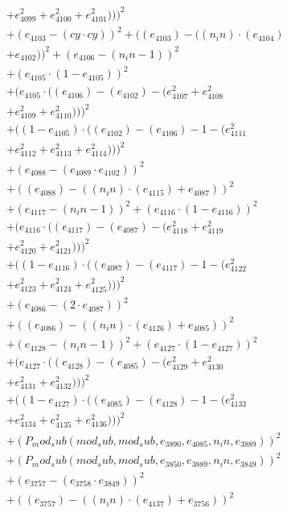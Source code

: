 \documentclass[10pt, a4paper]{article}
\begin{document}
\begin{small}
\begin{align*}
& + e_{4099}^{2} + e_{4100}^{2} + e_{4101}^{2})))^{2} \\
& + (e_{4103} - (cy  \cdot  cy))^{2} + ((e_{4103}) - ((n_in)  \cdot  (e_{4104}) \\
& + e_{4102}))^{2} + (e_{4106} - (n_in - 1))^{2} \\
& + (e_{4105}  \cdot  (1 - e_{4105}))^{2} \\
& + (e_{4105}  \cdot  ((e_{4106}) - (e_{4102}) - (e_{4107}^{2} + e_{4108}^{2} \\
& + e_{4109}^{2} + e_{4110}^{2})))^{2} \\
& + ((1 - e_{4105})  \cdot  ((e_{4102}) - (e_{4106}) - 1 - (e_{4111}^{2} \\
& + e_{4112}^{2} + e_{4113}^{2} + e_{4114}^{2})))^{2} \\
& + (e_{4088} - (e_{4089}  \cdot  e_{4102}))^{2} \\
& + ((e_{4088}) - ((n_in)  \cdot  (e_{4115}) + e_{4087}))^{2} \\
& + (e_{4117} - (n_in - 1))^{2} + (e_{4116}  \cdot  (1 - e_{4116}))^{2} \\
& + (e_{4116}  \cdot  ((e_{4117}) - (e_{4087}) - (e_{4118}^{2} + e_{4119}^{2} \\
& + e_{4120}^{2} + e_{4121}^{2})))^{2} \\
& + ((1 - e_{4116})  \cdot  ((e_{4087}) - (e_{4117}) - 1 - (e_{4122}^{2} \\
& + e_{4123}^{2} + e_{4124}^{2} + e_{4125}^{2})))^{2} \\
& + (e_{4086} - (2  \cdot  e_{4087}))^{2} \\
& + ((e_{4086}) - ((n_in)  \cdot  (e_{4126}) + e_{4085}))^{2} \\
& + (e_{4128} - (n_in - 1))^{2} + (e_{4127}  \cdot  (1 - e_{4127}))^{2} \\
& + (e_{4127}  \cdot  ((e_{4128}) - (e_{4085}) - (e_{4129}^{2} + e_{4130}^{2} \\
& + e_{4131}^{2} + e_{4132}^{2})))^{2} \\
& + ((1 - e_{4127})  \cdot  ((e_{4085}) - (e_{4128}) - 1 - (e_{4133}^{2} \\
& + e_{4134}^{2} + e_{4135}^{2} + e_{4136}^{2})))^{2} \\
& + (P_mod_sub(mod_sub, mod_sub, e_{3890}, e_{4085}, n_in, e_{3889}))^{2} \\
& + (P_mod_sub(mod_sub, mod_sub, e_{3850}, e_{3889}, n_in, e_{3849}))^{2} \\
& + (e_{3757} - (e_{3758}  \cdot  e_{3849}))^{2} \\
& + ((e_{3757}) - ((n_in)  \cdot  (e_{4137}) + e_{3756}))^{2} \\

\end{align*}
\end{small}
\end{document}
